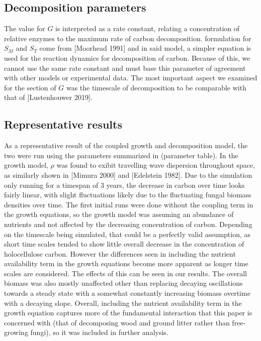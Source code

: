 \documentclass[12pt]{article}
\begin{document}
\begin{multicols}{2}

\subsection{Decomposition parameters}
The value for $G$ is interpreted as a rate constant, relating a concentration of relative enzymes to the maximum rate of carbon decomposition. formulation for $S_{M}$ and $S_{T}$ come from [Moorhead 1991] and in said model, a simpler equation is used for the reaction dynamics for decomposition of carbon. Because of this, we cannot use the same rate constant and must base this parameter of agreement with other models or experimental data. The most important aspect we examined for the section of $G$ was the timescale of decomposition to be comparable with that of [Lustenhouwer 2019].

\subsection{Representative results}
As a representative result of the coupled growth and decomposition model, the two were run using the parameters summarized in (parameter table). In the growth model, $\rho$ was found to exibit travelling wave dispersion throughout space, as similarly shown in [Mimura 2000] and [Edelstein 1982]. Due to the simulation only running for a timespan of 3 years, the decrease in carbon over time looks fairly linear, with slight fluctuations likely due to the fluctuating fungal biomass densities over time. The first initial runs were done without the coupling term in the growth equations, so the growth model was assuming an abundance of nutrients and not affected by the decreasing concentration of carbon. Depending on the timescale being simulated, that could be a perfectly valid assumption, as short time scales tended to show little overall decrease in the concentration of holocellulose carbon. However the differences seen in including the nutrient availability term in the growth equations become more apparent as longer time scales are considered. The effects of this can be seen in our results. The overall biomass was also mostly unaffected other than replacing decaying oscillations towards a steady state with a somewhat constantly increasing biomass overtime with a decaying slope. Overall, including the nutrient availability term in the growth equation captures more of the fundamental interaction that this paper is concerned with (that of decomposing wood and ground litter rather than free-growing fungi), so it was included in further analysis. 


\end{multicols}
\end{document}
